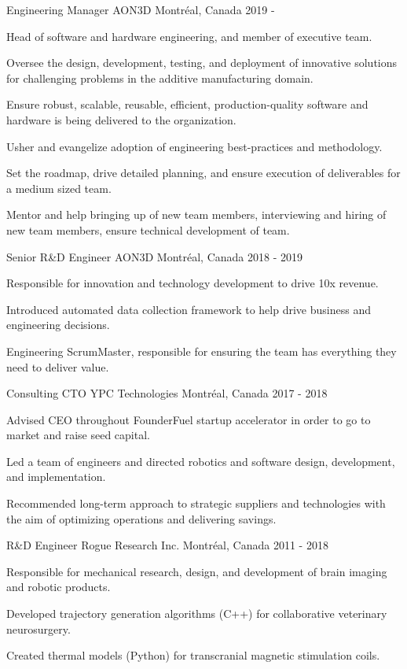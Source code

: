\begin{cventries}

\cventry
{Engineering Manager}
{AON3D}
{Montréal, Canada}
{2019 - }
{
\begin{cvitems} 
\item{Head of software and hardware engineering, and member of executive team.}
\item{Oversee the design, development, testing, and deployment of innovative solutions for challenging problems in the additive manufacturing domain.}
\item{Ensure robust, scalable, reusable, efficient, production-quality software and hardware is being delivered to the organization.}
\item{Usher and evangelize adoption of engineering best-practices and methodology.}
\item{Set the roadmap, drive detailed planning, and ensure execution of deliverables for a medium sized team.}
\item{Mentor and help bringing up of new team members, interviewing and hiring of new team members, ensure technical development of team.}
\end{cvitems}
}

\cventry
{Senior R\&D Engineer}
{AON3D}
{Montréal, Canada}
{2018 - 2019}
{
\begin{cvitems} 
\item{Responsible for innovation and technology development to drive 10x revenue.}
\item{Introduced automated data collection framework to help drive business and engineering decisions.}
\item{Engineering ScrumMaster, responsible for ensuring the team has everything they need to deliver value.}
\end{cvitems}
}

\cventry
{Consulting CTO}
{YPC Technologies}
{Montréal, Canada}
{2017 - 2018}
{
\begin{cvitems} 
\item{Advised CEO throughout FounderFuel startup accelerator in order to go to market and raise seed capital.}
\item{Led a team of engineers and directed robotics and software design, development, and implementation.}
\item{Recommended long-term approach to strategic suppliers and technologies with the aim of optimizing operations and delivering savings.}
\end{cvitems}
}

\cventry
{R\&D Engineer}
{Rogue Research Inc.}
{Montréal, Canada}
{2011 - 2018}
{
\begin{cvitems} 
\item{Responsible for mechanical research, design, and development of brain imaging and robotic products.}
\item{Developed trajectory generation algorithms (C++) for collaborative veterinary neurosurgery.}
\item{Created thermal models (Python) for transcranial magnetic stimulation coils.}
\end{cvitems}
}

\end{cventries}